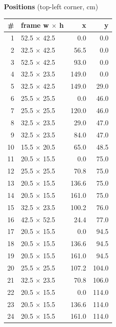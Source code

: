 \documentclass[a4paper,landscape,10pt]{article}
\begin{document}
\begin{minipage}[t]{0.25\textwidth}
\vspace{8pt}
{\bfseries Positions} (top-left corner, cm)\\[2pt]
\tiny
\begin{tabular}{@{}r l r r@{}}
\toprule
\# & frame w $\times$ h & x & y \\
\midrule
1 & 52.5 $\times$ 42.5 & 0.0 & 0.0 \\
2 & 32.5 $\times$ 42.5 & 56.5 & 0.0 \\
3 & 52.5 $\times$ 42.5 & 93.0 & 0.0 \\
4 & 32.5 $\times$ 23.5 & 149.0 & 0.0 \\
5 & 32.5 $\times$ 42.5 & 149.0 & 29.0 \\
6 & 25.5 $\times$ 25.5 & 0.0 & 46.0 \\
7 & 25.5 $\times$ 25.5 & 120.0 & 46.0 \\
8 & 32.5 $\times$ 23.5 & 29.0 & 47.0 \\
9 & 32.5 $\times$ 23.5 & 84.0 & 47.0 \\
10 & 15.5 $\times$ 20.5 & 65.0 & 48.5 \\
11 & 20.5 $\times$ 15.5 & 0.0 & 75.0 \\
12 & 25.5 $\times$ 25.5 & 70.8 & 75.0 \\
13 & 20.5 $\times$ 15.5 & 136.6 & 75.0 \\
14 & 20.5 $\times$ 15.5 & 161.0 & 75.0 \\
15 & 32.5 $\times$ 23.5 & 100.2 & 76.0 \\
16 & 42.5 $\times$ 52.5 & 24.4 & 77.0 \\
17 & 20.5 $\times$ 15.5 & 0.0 & 94.5 \\
18 & 20.5 $\times$ 15.5 & 136.6 & 94.5 \\
19 & 20.5 $\times$ 15.5 & 161.0 & 94.5 \\
20 & 25.5 $\times$ 25.5 & 107.2 & 104.0 \\
21 & 32.5 $\times$ 23.5 & 70.8 & 106.0 \\
22 & 20.5 $\times$ 15.5 & 0.0 & 114.0 \\
23 & 20.5 $\times$ 15.5 & 136.6 & 114.0 \\
24 & 20.5 $\times$ 15.5 & 161.0 & 114.0 \\
\bottomrule
\end{tabular}
\end{minipage}
\clearpage
\end{document}
